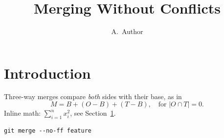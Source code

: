 \documentclass[11pt]{article}
\begin{document}
\title{Merging Without Conflicts}
\author{A.~Author}
\maketitle

\section{Introduction}\label{sec:intro}
Three-way merges compare \emph{both} sides with their base, as in
\begin{equation}
  M = B + (O - B) + (T - B), \quad \text{for } |O \cap T| = 0.
\end{equation}
Inline math: $\sum_{i=1}^{n} x_i^2$, see Section~\ref{sec:intro}.

\begin{verbatim}
git merge --no-ff feature
\end{verbatim}
\end{document}
